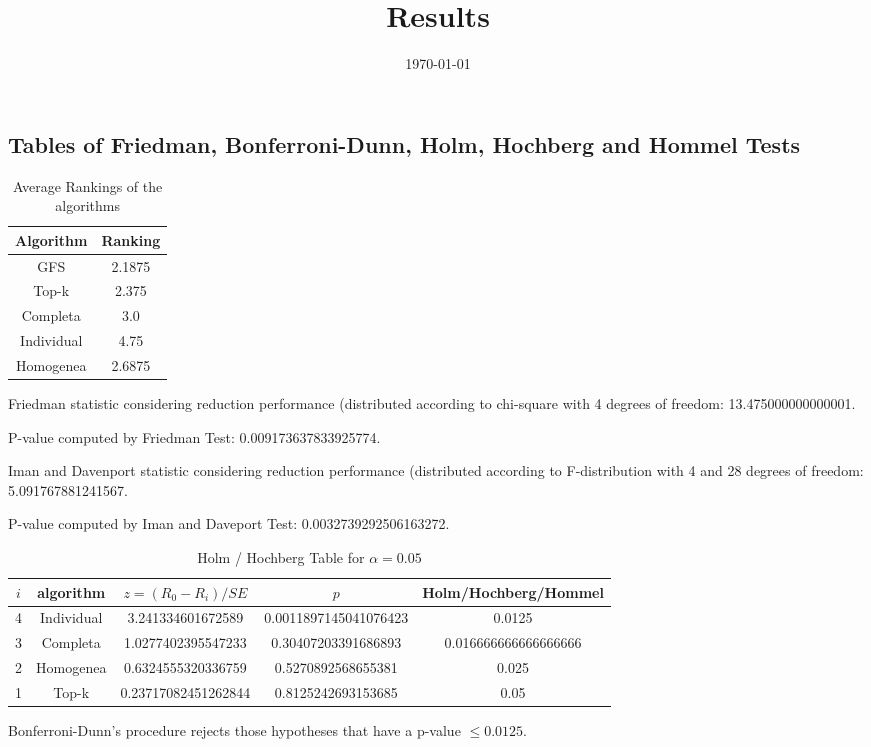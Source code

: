 \documentclass[a4paper,10pt]{article}
\title{Results}
\author{}
\date{\today}
\begin{document}
\begin{landscape}
\oddsidemargin 0in \topmargin 0in\maketitle
\section{Tables of Friedman, Bonferroni-Dunn, Holm, Hochberg and Hommel Tests}
\begin{table}[!htp]
\centering
\caption{Average Rankings of the algorithms
}\begin{tabular}{c|c}
Algorithm&Ranking\\
\hline
GFS&2.1875\\
Top-k&2.375\\
Completa&3.0\\
Individual&4.75\\
Homogenea&2.6875\\
\end{tabular}
\end{table}


Friedman statistic considering reduction performance (distributed according to chi-square with 4 degrees of freedom: 13.475000000000001.


P-value computed by Friedman Test: 0.009173637833925774.\newline

Iman and Davenport statistic considering reduction performance (distributed according to F-distribution with 4 and 28 degrees of freedom: 5.091767881241567.


P-value computed by Iman and Daveport Test: 0.0032739292506163272.\newline

\begin{table}[!htp]
\centering\tiny
\caption{Holm / Hochberg Table for $\alpha=0.05$}
\begin{tabular}{ccccc}
$i$&algorithm&$z=(R_0 - R_i)/SE$&$p$&Holm/Hochberg/Hommel\\
\hline
4&Individual&3.241334601672589&0.0011897145041076423&0.0125\\
3&Completa&1.0277402395547233&0.30407203391686893&0.016666666666666666\\
2&Homogenea&0.6324555320336759&0.5270892568655381&0.025\\
1&Top-k&0.23717082451262844&0.8125242693153685&0.05\\
\hline
\end{tabular}
\end{table}
Bonferroni-Dunn's procedure rejects those hypotheses that have a p-value $\le0.0125$.



\end{landscape}
\end{document}
